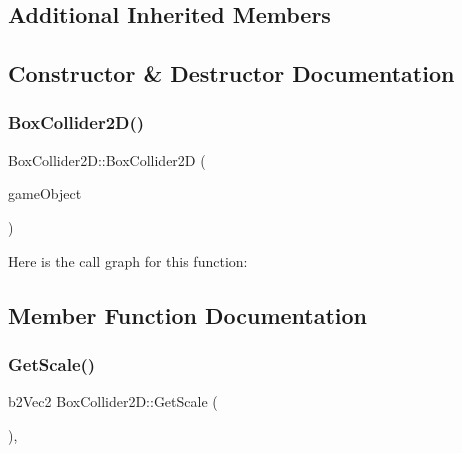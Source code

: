 \subsection*{Additional Inherited Members}


\subsection{Constructor \& Destructor Documentation}
\hypertarget{class_mason_1_1_box_collider2_d_ab74dd3e9b390bd7580e0137503000ac1}{}\label{class_mason_1_1_box_collider2_d_ab74dd3e9b390bd7580e0137503000ac1} 
\subsubsection{\texorpdfstring{Box\+Collider2\+D()}{BoxCollider2D()}}
{\footnotesize\ttfamily Box\+Collider2\+D\+::\+Box\+Collider2D (\begin{DoxyParamCaption}\item[{\hyperlink{class_mason_1_1_game_object}{Game\+Object} $\ast$}]{game\+Object }\end{DoxyParamCaption})\hspace{0.3cm}{\ttfamily [protected]}}

Here is the call graph for this function\+:


\subsection{Member Function Documentation}
\hypertarget{class_mason_1_1_box_collider2_d_a396aa615690a67c855b5025e3a1b3bce}{}\label{class_mason_1_1_box_collider2_d_a396aa615690a67c855b5025e3a1b3bce} 
\subsubsection{\texorpdfstring{Get\+Scale()}{GetScale()}}
{\footnotesize\ttfamily b2\+Vec2 Box\+Collider2\+D\+::\+Get\+Scale (\begin{DoxyParamCaption}{ }\end{DoxyParamCaption})\hspace{0.3cm}{\ttfamily [override]}, {\ttfamily [virtual]}}



